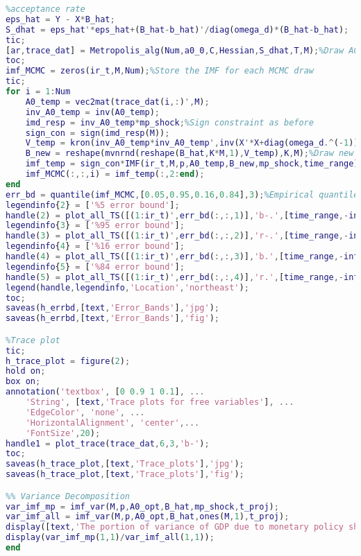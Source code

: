 \documentclass[11pt, oneside]{article}   	%
\begin{document}
\begin{appendices}
\begin{lstlisting}[language=Matlab ,caption={\textit{imf\textunderscore var.m} calculates the IMF variance based on shock given.}, label={code:imf_var}]
%% Metropolis algorithm and error bands
%acceptance rate
eps_hat = Y - X*B_hat;
S_dhat = eps_hat'*eps_hat+(B_hat-b_hat)'/diag(omega_d)*(B_hat-b_hat);
tic;
[ar,trace_dat] = Metropolis_alg(Num,a0_0,C,Hessian,S_dhat,T,M);%Draw A0 from its marginal posterior distribution
toc;
imf_MCMC = zeros(ir_t,M,Num);%Store the IMF for each MCMC draw 
tic;
for i = 1:Num
    A0_temp = vec2mat(trace_dat(i,:)',M);
    inv_A0_temp = inv(A0_temp);
    imd_resp = inv_A0_temp*mp_shock;%Sign constraint as before
    sign_con = sign(imd_resp(M));
    V_temp = kron(inv_A0_temp*inv_A0_temp',inv(X'*X+diag(omega_d.^(-1))));
    B_new = reshape(mvnrnd(reshape(B_hat,K*M,1),V_temp),K,M);%Draw new B based on each draw of A0
    imf_temp = sign_con*IMF(ir_t,M,p,A0_temp,B_new,mp_shock,time_range);%Calculate IMF for this sample of A0 and B
    imf_MCMC(:,:,i) = imf_temp(:,2:end);
end
err_bd = quantile(imf_MCMC,[0.05,0.95,0.16,0.84],3);%Empirical quantile for each IMF
legendinfo{2} = ['%5 error bound'];
handle(2) = plot_all_TS([(1:ir_t)',err_bd(:,:,1)],'b-.',[time_range,-inf,inf]);
legendinfo{3} = ['%95 error bound'];
handle(3) = plot_all_TS([(1:ir_t)',err_bd(:,:,2)],'r-.',[time_range,-inf,inf]);
legendinfo{4} = ['%16 error bound'];
handle(4) = plot_all_TS([(1:ir_t)',err_bd(:,:,3)],'b.',[time_range,-inf,inf]);
legendinfo{5} = ['%84 error bound'];
handle(5) = plot_all_TS([(1:ir_t)',err_bd(:,:,4)],'r.',[time_range,-inf,inf]);
legend(handle,legendinfo,'Location','northeast');
toc;
saveas(h_errbd,[text,'Error_Bands'],'jpg');
saveas(h_errbd,[text,'Error_Bands'],'fig');

%Trace plot
tic;
h_trace_plot = figure(2);
hold on;
box on;
annotation('textbox', [0 0.9 1 0.1], ...
    'String', [text,'Trace plots for free variables'], ...
    'EdgeColor', 'none', ...
    'HorizontalAlignment', 'center',...
    'FontSize',20);
handle1 = plot_trace(trace_dat,6,3,'b-');
toc;
saveas(h_trace_plot,[text,'Trace_plots'],'jpg');
saveas(h_trace_plot,[text,'Trace_plots'],'fig');

%% Variance Decomposition
var_imf_mp = imf_var(M,p,A0_opt,B_hat,mp_shock,t_proj);
var_imf_all = imf_var(M,p,A0_opt,B_hat,ones(M,1),t_proj);
display([text,'The portion of variance of GDP due to monetary policy shock is:',10]);
display(var_imf_mp(1,1)/var_imf_all(1,1));
end
\end{lstlisting}

\end{appendices}
\end{document}
